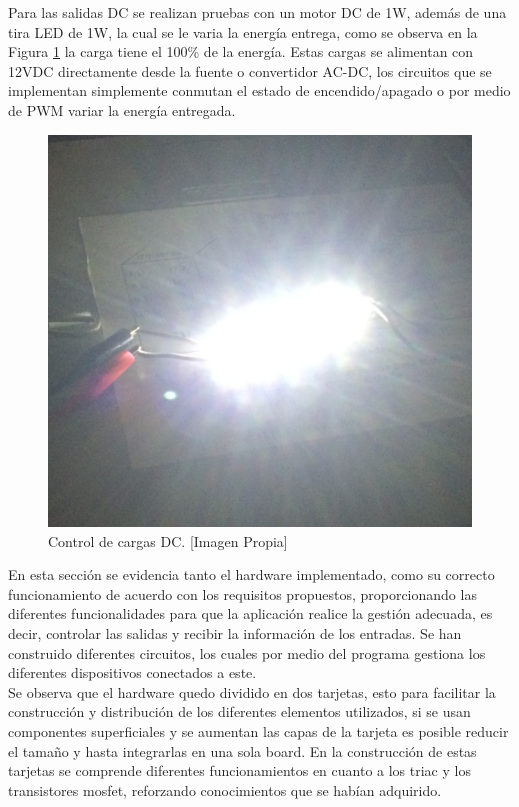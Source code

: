 Para las salidas DC se realizan pruebas con un motor DC de 1W, además de una tira LED de 1W, la cual se le varia la energía entrega, como se observa en la Figura \ref{fig:DCc} la carga tiene el 100\% de la energía. Estas cargas se alimentan con 12VDC directamente desde la fuente o convertidor AC-DC, los circuitos que se implementan simplemente conmutan el estado de encendido/apagado o por medio de PWM variar la energía entregada.\\

\begin{figure}[!t]
	\centering
	\caption[Control de cargas DC.]{Control de cargas DC. [Imagen Propia]}
	\label{fig:DCc}
	\includegraphics[width=0.5\linewidth]{Imagenes/DC1}
\end{figure}

En esta sección se evidencia tanto el hardware implementado, como su correcto funcionamiento de acuerdo con los requisitos propuestos, proporcionando las diferentes funcionalidades para que la aplicación realice la gestión adecuada, es decir, controlar las salidas y recibir la información de los entradas. Se han construido diferentes circuitos, los cuales por medio del programa gestiona los diferentes dispositivos conectados a este.\\

Se observa que el hardware quedo dividido en dos tarjetas, esto para facilitar la construcción y distribución de los diferentes elementos utilizados, si se usan componentes superficiales y se aumentan las capas de la tarjeta es posible reducir el tamaño y hasta integrarlas en una sola board. En la construcción de estas tarjetas se comprende diferentes funcionamientos en cuanto a los triac y los transistores mosfet, reforzando conocimientos que se habían adquirido.\\

